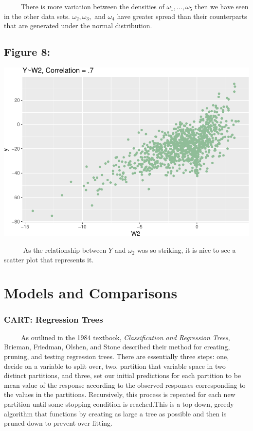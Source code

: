 \documentclass[12pt,twoside]{reedthesis}
\begin{document}
  ~~~~~There is more variation between the densities of
  \(\omega_1,...,\omega_5\) then we have seen in the other data sets.
  \(\omega_2,\omega_3,\) and \(\omega_4\) have greater spread than their
  counterparts that are generated under the normal distribution.
  
  \subsection{Figure 8:}\label{figure-8}
  
  \begin{center}\includegraphics{Thesis_files/figure-latex/fig8-1} \end{center}
  
  ~~~~~ As the relationship between \(Y\) and \(\omega_2\) was so
  striking, it is nice to see a scatter plot that represents it.
  
  \section{Models and Comparisons}\label{models-and-comparisons}
  
  \subsubsection{CART: Regression Trees}\label{cart-regression-trees}
  
  ~~~~~As outlined in the 1984 textbook, \emph{Classification and
  Regression Trees}, Brieman, Friedman, Olshen, and Stone described their
  method for creating, pruning, and testing regression trees. There are
  essentially three steps: one, decide on a variable to split over, two,
  partition that variable space in two distinct partitions, and three, set
  our initial predictions for each partition to be mean value of the
  response according to the observed responses corresponding to the values
  in the partitions. Recursively, this process is repeated for each new
  partition until some stopping condition is reached.This is a top down,
  greedy algorithm that functions by creating as large a tree as possible
  and then is pruned down to prevent over fitting.
  
\end{document}
